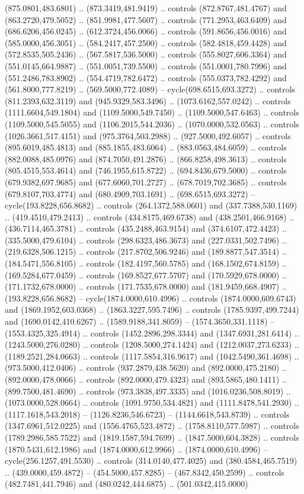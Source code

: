 (875.0801,483.6801) .. (873.3419,481.9419) .. controls (872.8767,481.4767) and (863.2720,479.5052) .. (851.9981,477.5607) .. controls (771.2953,463.6409) and (686.6206,456.0245) .. (612.3724,456.0066) .. controls (591.8656,456.0016) and (585.0000,456.3051) .. (584.2417,457.2500) .. controls (582.4818,459.4428) and (572.8535,505.2436) .. (567.5817,536.5000) .. controls (555.8027,606.3364) and (551.0145,664.9887) .. (551.0051,739.5500) .. controls (551.0001,780.7996) and (551.2486,783.8902) .. (554.4719,782.6472) .. controls (555.0373,782.4292) and (561.8000,777.8219) .. (569.5000,772.4089) -- cycle(698.6515,693.3272) .. controls (811.2393,632.3119) and (945.9329,583.3496) .. (1073.6162,557.0242) .. controls (1111.6604,549.1804) and (1109.5000,549.7450) .. (1109.5000,547.6463) .. controls (1109.5000,545.5055) and (1106.2015,544.2036) .. (1070.0000,532.0563) .. controls (1026.3661,517.4151) and (975.3764,503.2988) .. (927.5000,492.6057) .. controls (895.6019,485.4813) and (885.1855,483.6064) .. (883.0563,484.6059) .. controls (882.0088,485.0976) and (874.7050,491.2876) .. (866.8258,498.3613) .. controls (805.4515,553.4614) and (746.1955,615.8722) .. (694.8436,679.5000) .. controls (679.9382,697.9685) and (677.6060,701.2727) .. (678.7019,702.3685) .. controls (679.8107,703.4774) and (680.4909,703.1691) .. (698.6515,693.3272) -- cycle(193.8228,656.8682) .. controls (264.1372,588.0601) and (337.7388,530.1169) .. (419.4510,479.2413) .. controls (434.8175,469.6738) and (438.2501,466.9168) .. (436.7114,465.3781) .. controls (435.2488,463.9154) and (374.6107,472.4423) .. (335.5000,479.6104) .. controls (298.6323,486.3673) and (227.0331,502.7496) .. (219.6328,506.1215) .. controls (217.8702,506.9246) and (189.8877,547.3514) .. (184.5471,556.8105) .. controls (182.4197,560.5785) and (168.1502,674.8159) .. (169.5284,677.0459) .. controls (169.8527,677.5707) and (170.5929,678.0000) .. (171.1732,678.0000) .. controls (171.7535,678.0000) and (181.9459,668.4907) .. (193.8228,656.8682) -- cycle(1874.0000,610.4996) .. controls (1874.0000,609.6743) and (1869.1952,603.0368) .. (1863.3227,595.7496) .. controls (1785.9397,499.7244) and (1690.0142,410.6267) .. (1589.9188,341.8059) -- (1574.3650,331.1118) -- (1553.4325,325.4914) .. controls (1452.2896,298.3344) and (1347.6931,281.6414) .. (1243.5000,276.0280) .. controls (1208.5000,274.1424) and (1212.0037,273.6233) .. (1189.2521,284.0663) .. controls (1117.5854,316.9617) and (1042.5490,361.4698) .. (973.5000,412.0406) .. controls (937.2879,438.5620) and (892.0000,475.2180) .. (892.0000,478.0066) .. controls (892.0000,479.4323) and (893.5865,480.1411) .. (899.7500,481.4690) .. controls (973.3838,497.3335) and (1016.0236,508.8019) .. (1073.0000,528.0664) .. controls (1091.9750,534.4821) and (1111.8478,541.2930) .. (1117.1618,543.2018) -- (1126.8236,546.6723) -- (1144.6618,543.8739) .. controls (1347.6961,512.0225) and (1556.4765,523.4872) .. (1758.8110,577.5987) .. controls (1789.2986,585.7522) and (1819.1587,594.7699) .. (1847.5000,604.3828) .. controls (1870.5431,612.1986) and (1874.0000,612.9966) .. (1874.0000,610.4996) -- cycle(256.1257,491.5530) .. controls (314.0140,477.4025) and (380.4584,465.7519) .. (439.0000,459.4872) -- (454.5000,457.8285) -- (467.8342,450.2599) .. controls (482.7481,441.7946) and (480.0242,444.6875) .. (501.0342,415.0000) 